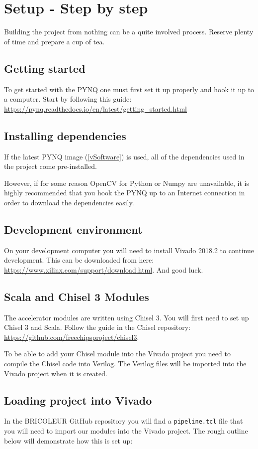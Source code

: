 \section{Setup - Step by step}
Building the project from nothing can be a quite involved process. Reserve plenty of time and prepare a cup of tea. 

\subsection{Getting started}
To get started with the PYNQ one must first set it up properly and hook it up to a computer. Start by following this guide:\\
\url{https://pynq.readthedocs.io/en/latest/getting_started.html}

\subsection{Installing dependencies}
If the latest PYNQ image (\ref{vSoftware}) is used, all of the dependencies used in the project come pre-installed.

However, if for some reason OpenCV for Python or Numpy are unavailable, it is highly recommended that you hook the PYNQ up to an Internet connection in order to download the dependencies easily.

\subsection{Development environment}
On your development computer you will need to install Vivado 2018.2 to continue development. This can be downloaded from here: \url{https://www.xilinx.com/support/download.html}. And good luck.

\subsection{Scala and Chisel 3 Modules}\label{ScalaChiselSub}
The accelerator modules are written using Chisel 3. You will first need to set up Chisel 3 and Scala. Follow the guide in the Chisel repository: \url{https://github.com/freechipsproject/chisel3}.

To be able to add your Chisel module into the Vivado project you need to compile the Chisel code into Verilog. The Verilog files will be imported into the Vivado project when it is created.

\subsection{Loading project into Vivado}
In the BRICOLEUR GitHub repository you will find a \texttt{pipeline.tcl} file that you will need to import our modules into the Vivado project. The rough outline below will demonstrate how this is set up:

